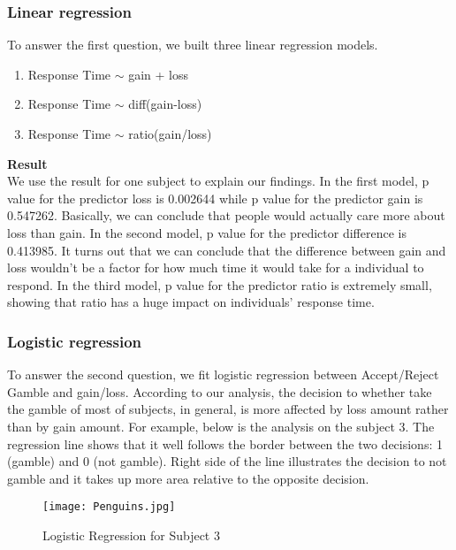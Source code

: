 \subsubsection {Linear regression}
To answer the first question, we built three linear regression models.
\begin{enumerate}
\item  Response Time $\sim$ gain + loss
\item  Response Time $\sim$ diff(gain-loss)
\item  Response Time $\sim$ ratio(gain/loss)
\end {enumerate}
\textbf{Result} \\
We use the result for one subject to explain our findings. In the first model, 
p value for the predictor loss is 0.002644 while p value for the predictor gain 
is 0.547262. Basically, we can conclude that people would actually care more 
about loss than gain. In the second model, p value for the predictor difference
is 0.413985.  It turns out that we can conclude that the difference between gain 
and loss wouldn't be a factor for how much time it would take for a individual 
to respond. In the third model, p value for the predictor ratio is extremely 
small, showing that ratio has a huge impact on individuals' response time.

\subsubsection {Logistic regression}
\noindent
To answer the second question, we fit logistic regression between Accept/Reject
Gamble and gain/loss. According to our analysis, the decision to whether take 
the gamble of most of subjects, in general, is more affected by loss amount 
rather than by gain amount.  For example, below is the analysis on the subject 
3. The regression line shows that it well follows the border between the two 
decisions: 1 (gamble) and 0 (not gamble). Right side of the line illustrates 
the decision to not gamble and it takes up more area relative to the opposite 
decision.

\begin{figure}[H]
	\centering
		\texttt{[image: Penguins.jpg]}
	\caption{Logistic Regression for Subject 3}
\end{figure}
